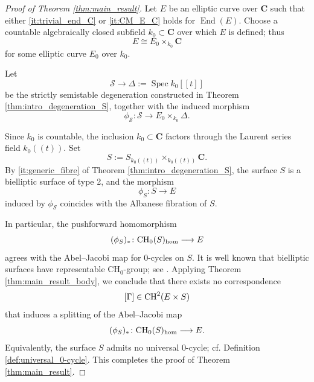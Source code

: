 \documentclass[11pt,letterpaper]{amsart}
\newcommand{\CH}{\textnormal{CH}}
\newcommand{\ca}[1]{{\mathcal{#1}}}
\numberwithin{equation}{section}
\theoremstyle{definition}
\theoremstyle{remark}
\newcommand{\bbC}{\mathbf{C}}
\newcommand{\Ch}{\operatorname{CH_{0}}}
\DeclareMathOperator{\End}{End}
\DeclareMathOperator{\Spec}{Spec}
\begin{document}
\begin{proof}[Proof of Theorem \ref{thm:main_result}] Let $E$ be an elliptic curve over $\bbC$ such that either \ref{it:trivial_end_C} or \ref{it:CM_E_C} holds for $\End(E)$. Choose a countable algebraically closed subfield $k_0\subset\bbC$ over which $E$ is defined; thus $$E\cong E_0\times_{k_{0}}\bbC$$ for some elliptic curve $E_{0}$ over $k_{0}$.\par
Let $$\ca S\longrightarrow\Delta:=\Spec k_{0}[[t]]$$ be the strictly semistable degeneration constructed in Theorem \ref{thm:intro_degeneration_S}, together with the induced morphism $$\phi_{\mathcal S} \colon \mathcal S \longrightarrow E_0 \times_{k_{0}} \Delta .$$\par
Since $k_0$ is countable, the inclusion $k_0\subset\bbC$ factors through the Laurent series field $k_0((t))$. Set $$S:=S_{k_{0}((t))}\times_{k_{0}((t))}\bbC.$$
By \eqref{it:generic_fibre} of Theorem \ref{thm:intro_degeneration_S}, the surface $S$ is a bielliptic surface of type 2, and the morphism $$\phi_{S}\colon S\longrightarrow E$$ induced by $\phi_{\ca S}$ coincides with the Albanese fibration of $S$.\par
In particular, the pushforward homomorphism $$(\phi_{S})_{\ast} \colon \CH_0(S)_{\hom} \longrightarrow E $$ agrees with the Abel--Jacobi map for $0$-cycles on $S$. It is well known that bielliptic surfaces have representable $\Ch$-group; see \cite[Example (2)]{bloch-srinivas}. Applying Theorem \ref{thm:main_result_body}, we conclude that there exists no correspondence $$
[\Gamma] \in \CH^{2}(E \times S)
$$
that induces a splitting of the Abel--Jacobi map 
\begin{equation*}
(\phi_{S})_{\ast} \colon \CH_0(S)_{\hom} \longrightarrow E.
\end{equation*}
Equivalently, the surface $S$ admits no universal $0$-cycle; cf. Definition \ref{def:universal_0-cycle}. This completes the proof of Theorem \ref{thm:main_result}.    
\end{proof}
\end{document}
